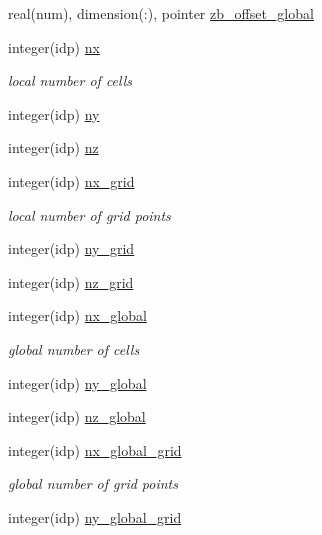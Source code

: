 \begin{DoxyCompactItemize}
\item 
real(num), dimension(\+:), pointer \hyperlink{namespaceshared__data_afbe25de83b836cecc5e144cdee8fbb3e}{zb\+\_\+offset\+\_\+global}
\item 
integer(idp) \hyperlink{namespaceshared__data_ac04f4ac48d632f67068e3623d39b847d}{nx}
\begin{DoxyCompactList}\small\item\em local number of cells \end{DoxyCompactList}\item 
integer(idp) \hyperlink{namespaceshared__data_a93124935df137a6ba362bdc8dcba6d5f}{ny}
\item 
integer(idp) \hyperlink{namespaceshared__data_ad701bfe58518b2efa7568d9d92d4d99a}{nz}
\item 
integer(idp) \hyperlink{namespaceshared__data_aa73479038f32b1c04369ee19f989a864}{nx\+\_\+grid}
\begin{DoxyCompactList}\small\item\em local number of grid points \end{DoxyCompactList}\item 
integer(idp) \hyperlink{namespaceshared__data_a27d84fa0143fefa733f5915a29ee2280}{ny\+\_\+grid}
\item 
integer(idp) \hyperlink{namespaceshared__data_a316d1007b26804f619b2863d225113b4}{nz\+\_\+grid}
\item 
integer(idp) \hyperlink{namespaceshared__data_aacbd3bff423894ff20cec97f4286ba68}{nx\+\_\+global}
\begin{DoxyCompactList}\small\item\em global number of cells \end{DoxyCompactList}\item 
integer(idp) \hyperlink{namespaceshared__data_a09d6529711aae354967f6d5db76220c1}{ny\+\_\+global}
\item 
integer(idp) \hyperlink{namespaceshared__data_a4d554ba2caa9b741974e24ab105829e7}{nz\+\_\+global}
\item 
integer(idp) \hyperlink{namespaceshared__data_a57f53cc0b24ace5f77db7a6a1835f7fb}{nx\+\_\+global\+\_\+grid}
\begin{DoxyCompactList}\small\item\em global number of grid points \end{DoxyCompactList}\item 
integer(idp) \hyperlink{namespaceshared__data_acbb834ec9e8d36f975728eb709cffebb}{ny\+\_\+global\+\_\+grid}
\item 

\end{DoxyCompactItemize}
